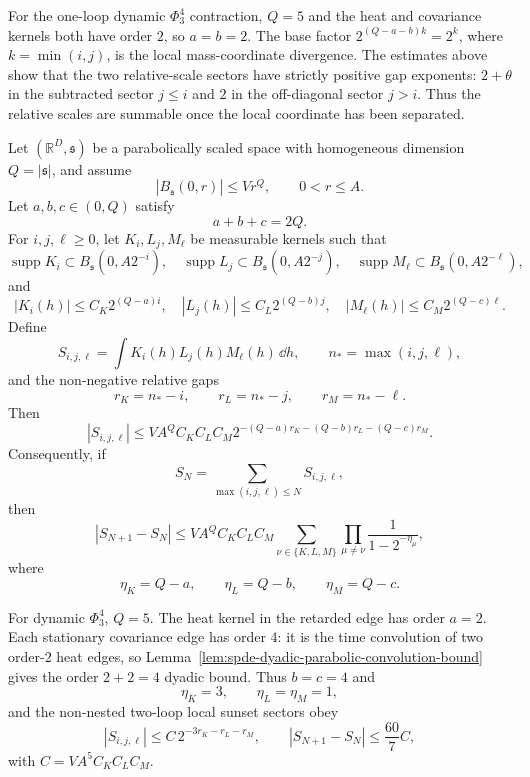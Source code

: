 For the one-loop dynamic \(\Phi^4_3\) contraction, \(Q=5\) and the heat and
covariance kernels both have order \(2\), so \(a=b=2\).  The base factor
\(2^{(Q-a-b)k}=2^k\), where \(k=\min(i,j)\), is the local mass-coordinate
divergence.  The estimates above show that the two relative-scale sectors have
strictly positive gap exponents:
\(2+\theta\) in the subtracted sector \(j\leq i\) and \(2\) in the
off-diagonal sector \(j>i\).  Thus the relative scales are summable once the
local coordinate has been separated.

\begin{proposition}
\label{prop:spde-two-loop-sunset-scale-gaps}
Let \((\mathbb R^D,\mathfrak s)\) be a parabolically scaled space with
homogeneous dimension \(Q=|\mathfrak s|\), and assume
\[
  |B_{\mathfrak s}(0,r)|\leq V r^Q,\qquad 0<r\leq A .
\]
Let \(a,b,c\in(0,Q)\) satisfy
\[
  a+b+c=2Q .
\]
For \(i,j,\ell\geq0\), let \(K_i,L_j,M_\ell\) be measurable kernels such
that
\[
  \operatorname{supp}K_i\subset B_{\mathfrak s}(0,A2^{-i}),\quad
  \operatorname{supp}L_j\subset B_{\mathfrak s}(0,A2^{-j}),\quad
  \operatorname{supp}M_\ell\subset B_{\mathfrak s}(0,A2^{-\ell}),
\]
and
\[
  |K_i(h)|\leq C_K2^{(Q-a)i},\quad
  |L_j(h)|\leq C_L2^{(Q-b)j},\quad
  |M_\ell(h)|\leq C_M2^{(Q-c)\ell}.
\]
Define
\[
  S_{i,j,\ell}=\int K_i(h)L_j(h)M_\ell(h)\,\dd h,
  \qquad
  n_*=\max(i,j,\ell),
\]
and the non-negative relative gaps
\[
  r_K=n_*-i,\qquad r_L=n_*-j,\qquad r_M=n_*-\ell .
\]
Then
\begin{equation}
  |S_{i,j,\ell}|
  \leq
  V A^Q C_KC_LC_M
  2^{-(Q-a)r_K-(Q-b)r_L-(Q-c)r_M}.
  \label{eq:spde-two-loop-sunset-gap-bound}
\end{equation}
Consequently, if
\[
  S_N=\sum_{\max(i,j,\ell)\leq N}S_{i,j,\ell},
\]
then
\begin{equation}
  |S_{N+1}-S_N|
  \leq
  V A^Q C_KC_LC_M
  \sum_{\nu\in\{K,L,M\}}
  \prod_{\mu\neq\nu}\frac{1}{1-2^{-\eta_\mu}},
  \label{eq:spde-two-loop-sunset-shell-bound}
\end{equation}
where
\[
  \eta_K=Q-a,\qquad \eta_L=Q-b,\qquad \eta_M=Q-c .
\]

For dynamic \(\Phi^4_3\), \(Q=5\).  The heat kernel in the retarded edge has
order \(a=2\).  Each stationary covariance edge has order \(4\): it is the
time convolution of two order-\(2\) heat edges, so
Lemma~\ref{lem:spde-dyadic-parabolic-convolution-bound} gives the
order \(2+2=4\) dyadic bound.  Thus \(b=c=4\) and
\[
  \eta_K=3,\qquad \eta_L=\eta_M=1,
\]
and the non-nested two-loop local sunset sectors obey
\begin{equation}
  |S_{i,j,\ell}|
  \leq
  C\,2^{-3r_K-r_L-r_M},
  \qquad
  |S_{N+1}-S_N|\leq \frac{60}{7}C ,
  \label{eq:spde-phi-four-three-sunset-sector-bound}
\end{equation}
with \(C=V A^5C_KC_LC_M\).


\end{proposition}
